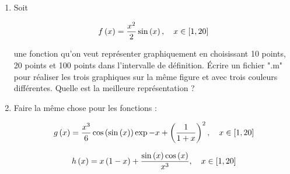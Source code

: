 \begin{enumerate}[label=\alph*)]
  \item Soit
  
  \begin{equation*}
    f \left(x\right) = \dfrac{x^{2}}{2} \sin \left(x\right), 
    \quad x \in \left[1, 20\right]
  \end{equation*}
  
  une fonction qu'on veut représenter graphiquement en choisissant 10 points, 20 points et 100 points dans l'intervalle de définition. Écrire un fichier ".m" pour réaliser les trois graphiques sur la même figure et avec trois couleurs différentes. Quelle est la meilleure représentation ?
  
  \item Faire la même chose pour les fonctions :
  
  \begin{equation*}
    g \left(x\right) = \dfrac{x^{3}}{6} \cos \left(\sin \left(x\right)\right) \exp{-x} + \left(\dfrac{1}{1+x}\right)^{2}, 
    \quad x \in \left[1, 20\right]
  \end{equation*}
  
  \begin{equation*}
    h \left(x\right) = x \left(1 - x\right) + \dfrac{\sin \left(x\right) \cos \left(x\right)}{x^3},
    \quad x \in \left[1, 20\right]
  \end{equation*}
\end{enumerate}




